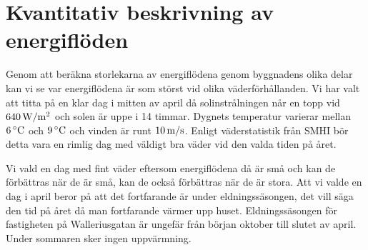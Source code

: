 \section{Kvantitativ beskrivning av energiflöden}

Genom att beräkna storlekarna av energiflödena genom byggnadens olika delar kan vi se var energiflödena är som störst vid olika väderförhållanden. Vi har valt att titta på en klar dag i mitten av april då solinstrålningen når en topp vid $\unit[640]{W/m^2}$ och solen är uppe i 14 timmar. Dygnets temperatur varierar mellan $\unit[6]{^\circ C}$ och $\unit[9]{^\circ C}$ och vinden är runt $\unit[10]{m/s}$. Enligt väderstatistik från SMHI bör detta vara en rimlig dag med väldigt bra väder vid den valda tiden på året.

Vi vald en dag med fint väder eftersom energiflödena då är små och kan de förbättras när de är små, kan de också förbättras när de är stora. Att vi valde en dag i april beror på att det fortfarande är under eldningssäsongen, det vill säga den tid på året då man fortfarande värmer upp huset. Eldningssäsongen för fastigheten på Walleriusgatan är ungefär från början oktober till slutet av april. Under sommaren sker ingen uppvärmning.








